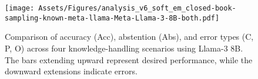 \begin{figure}[t]
    \centering
    \texttt{[image: Assets/Figures/analysis\_v6\_soft\_em\_closed-book-sampling-known-meta-llama-Meta-Llama-3-8B-both.pdf]} 
    \caption{Comparison of accuracy (Acc), abstention (Abs), and error types (C, P, O) across four knowledge-handling scenarios using Llama-3 8B. The bars extending upward represent desired performance, while the downward extensions indicate errors.}
    \label{figure:eval_v6_ID_OOD}
\end{figure}

